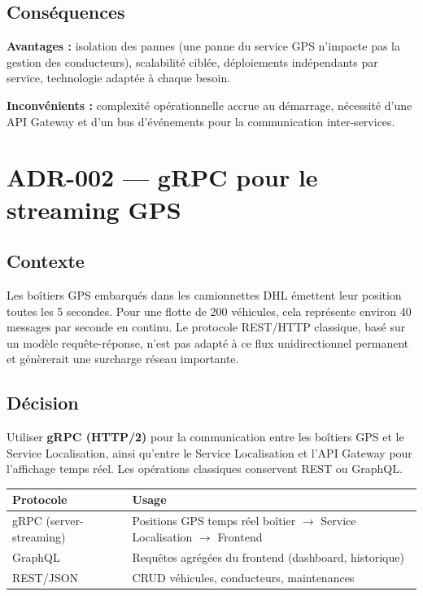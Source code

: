 \documentclass[10pt,a4paper]{article}
\begin{document}
\subsection{Conséquences}
\textbf{Avantages :} isolation des pannes (une panne du service GPS n'impacte pas la gestion des conducteurs), scalabilité ciblée, déploiements indépendants par service, technologie adaptée à chaque besoin.

\noindent\textbf{Inconvénients :} complexité opérationnelle accrue au démarrage, nécessité d'une API Gateway et d'un bus d'événements pour la communication inter-services.

\section{ADR-002 --- gRPC pour le streaming GPS}

\subsection{Contexte}
Les boîtiers GPS embarqués dans les camionnettes DHL émettent leur position toutes les 5 secondes. Pour une flotte de 200 véhicules, cela représente environ 40 messages par seconde en continu. Le protocole REST/HTTP classique, basé sur un modèle requête-réponse, n'est pas adapté à ce flux unidirectionnel permanent et génèrerait une surcharge réseau importante.

\subsection{Décision}
Utiliser \textbf{gRPC (HTTP/2)} pour la communication entre les boîtiers GPS et le Service Localisation, ainsi qu'entre le Service Localisation et l'API Gateway pour l'affichage temps réel. Les opérations classiques conservent REST ou GraphQL.

\vspace{4pt}
\begin{tabularx}{\linewidth}{lX}
  \toprule
  \small\textbf{Protocole} & \small\textbf{Usage} \\
  \midrule
  gRPC (server-streaming) & Positions GPS temps réel boîtier $\rightarrow$ Service Localisation $\rightarrow$ Frontend \\
  GraphQL                 & Requêtes agrégées du frontend (dashboard, historique) \\
  REST/JSON               & CRUD véhicules, conducteurs, maintenances \\
  \bottomrule
\end{tabularx}
\end{document}
